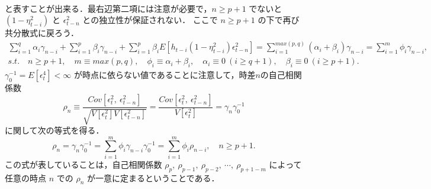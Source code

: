 \documentclass[8pt]{jsarticle}
\def\Exp#1{\mbox{$E \left[ #1 \right]$}}
\def\Var#1{\mbox{$V \left[ #1 \right]$}}
\def\Cov#1#2{\mbox{$Cov \left[ #1,\ #2 \right]$}}
\begin{document}
\begin{breakbox}
\begin{align*}
	\end{align*}
	と表すことが出来る．最右辺第二項には注意が必要で，$n \geq p+1$ でないと $(1 - \eta_{t-i}^2)$ と $\epsilon_{t-n}^2$ との独立性が保証されない．
	ここで $n \geq p+1$ の下で再び共分散式に戻ろう．
	\begin{align*}
		\sum_{i=1}^{q} \alpha_i \gamma_{n - i} 
			+ \sum_{i=1}^{p} \beta_i \gamma_{n - i} 
			+ \sum_{i=1}^{p} \beta_i \Exp{h_{t-i}(1 - \eta_{t-i}^2) \epsilon_{t-n}^2} 
		= \sum_{i=1}^{max(p, q)} (\alpha_i + \beta_i) \gamma_{n - i}
		= \sum_{i=1}^{m} \phi_i \gamma_{n - i}, \\
		s.t.\quad n \geq p+1,\quad m \equiv max(p, q),\quad \phi_i \equiv \alpha_i + \beta_i,\quad \alpha_i \equiv 0\ (i \geq q+1),\quad \beta_i \equiv 0\ (i \geq p+1).
	\end{align*}
	$\gamma_0^{-1} = \Exp{\epsilon_t^4} < \infty$ が時点に依らない値であることに注意して，時差$n$の自己相関係数 
	\[
		\rho_n \equiv \frac{\Cov{\epsilon_t^2}{\epsilon_{t-n}^2}}{\sqrt{\Var{\epsilon_t^2}\Var{\epsilon_{t-n}^2}}} 
		= \frac{\Cov{\epsilon_t^2}{\epsilon_{t-n}^2}}{\Var{\epsilon_t^2}} 
		= \gamma_n \gamma_0^{-1}
	\]
	に関して次の等式を得る．
	\[
		\rho_n = \gamma_n \gamma_0^{-1} = \sum_{i=1}^{m} \phi_i \gamma_{n - i} \gamma_0^{-1} = \sum_{i=1}^{m} \phi_i \rho_{n - i},\quad  n \geq p+1.
	\]
	この式が表していることは，自己相関係数 $\rho_{p},\ \rho_{p-1},\ \rho_{p-2},\ \cdots,\ \rho_{p+1-m}$ によって任意の時点 $n$ での $\rho_n$ が一意に定まるということである．\\
\end{breakbox}
\end{document}
